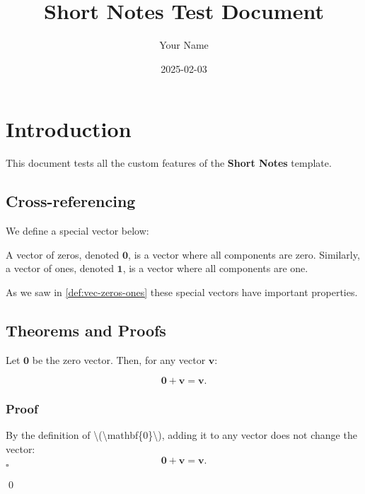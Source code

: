 \documentclass[
]{article}
\title{Short Notes Test Document}
\author{Your Name}
\date{2025-02-03}
\newcommand{\nmusemibold}{\fontseries{sb}\selectfont}
\renewenvironment{proof}{{\color{nmuprimaryblue}\nmusemibold Proof:} \normalfont}{\qed}
\begin{document}
\maketitle

\section{Introduction}\label{introduction}

This document tests all the custom features of the \textbf{Short Notes}
template.

\subsection{Cross-referencing}\label{cross-referencing}

We define a special vector below:

\begin{definition}\label{def:vec-zeros-ones}

A vector of zeros, denoted \(\mathbf{0}\), is a vector where all
components are zero. Similarly, a vector of ones, denoted
\(\mathbf{1}\), is a vector where all components are one.

\end{definition}

As we saw in \autoref{def:vec-zeros-ones} these special vectors have
important properties.

\subsection{Theorems and Proofs}\label{theorems-and-proofs}

\begin{theorem}\label{thm:vector-addition}

Let \(\mathbf{0}\) be the zero vector. Then, for any vector
\(\mathbf{v}\):

\[
\mathbf{0} + \mathbf{v} = \mathbf{v}.
\]

\end{theorem}

\subsubsection{Proof}\label{proof}

\begin{proof}

By the definition of
\textbackslash(\textbackslash mathbf\{0\}\textbackslash), adding it to
any vector does not change the vector: \[
\mathbf{0} + \mathbf{v} = \mathbf{v}.
\] \(\square\)

\end{proof}
\end{document}
